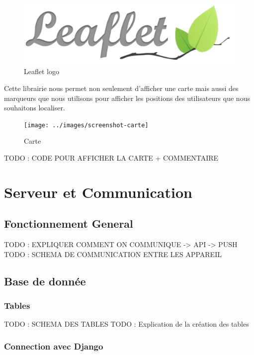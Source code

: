 \documentclass[french]{article}
\begin{document}
	\begin{figure}[H]
		\centering
		\includegraphics[scale=0.5]{../images/leaflet-logo.png}
		\caption{Leaflet logo}
		\label{Leaflet logo}
	\end{figure} 
	
	
	
	Cette librairie nous permet non seulement d'afficher une carte mais aussi des marqueurs que nous utilisons pour afficher les positions des utilisateurs que nous souhaitons localiser. 
	
	\begin{figure}[H]
		\centering
		\texttt{[image: ../images/screenshot-carte]}
		\caption{Carte}
		\label{Carte}
	\end{figure} 
	
	TODO : CODE POUR AFFICHER LA CARTE + COMMENTAIRE
	
	\section{Serveur et Communication}	
	\subsection{Fonctionnement General}
	
	TODO : EXPLIQUER COMMENT ON COMMUNIQUE -> API -> PUSH
	TODO : SCHEMA DE COMMUNICATION ENTRE LES APPAREIL 
	
	\subsection{Base de donnée}
	\subsubsection{Tables}
	
	TODO : SCHEMA DES TABLES
	TODO : Explication de la création des tables 
	
	\subsubsection{Connection avec Django}
	
\end{document}
